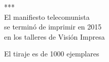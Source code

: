 \newpage
\thispagestyle{empty}

\begin{center}
\vspace*{\fill}
***\\
El manifiesto telecomunista\\
se terminó de imprimir en 2015\\
en los talleres de Visión Impresa

El tiraje es de 1000 ejemplares
\end{center}
